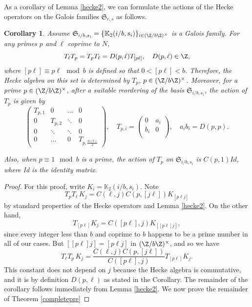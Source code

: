 \documentclass[12pt]{amsart}
\newtheorem{corollary}[theorem]{Corollary}
\theoremstyle{definition}
\theoremstyle{remark}
\begin{document}
As a corollary of Lemma \ref{hecke2}, 
we can formulate the actions of the Hecke operators on the Galois families $\mathfrak S_{r,s}$ as follows. 
\begin{corollary}\label{hecke4}
   Assume $\mathfrak S_{i/b,s_i}=\{\mathbb{K}_2(i/b,s_i)\}_{i\in (\Z/b\Z)^\times}$ is a Galois family. For any primes $p$ and $\ell$ coprime to $N$, 
    $$
     T_\ell T_p= T_pT_\ell =D(p,\ell)T_{[p\ell]},\quad   D(p,\ell) \in \Z,
    $$
    where $[p\ell] \equiv p\ell \mod b$ is defined so that $0<[p\ell]<b$. Therefore, the Hecke algebra on this set is determined by $T_p$, $p\in (\Z/b\Z)^\times$. Moreover,  for a prime $p\in (\Z/b\Z)^\times$, after a suitable reordering of the basis $\mathfrak S_{i/b,s_i}$, the action of $T_p$ is given by
    $$
       \begin{pmatrix}
             T_{p,1} &0& \dots & 0\\
             0& T_{p,2} & \ddots & 0\\
               0&\ddots & \ddots & 0\\
             0&\dots& 0&  T_{p,\frac{\phi(b)}2}
       \end{pmatrix},  \quad  
       T_{p,i}=
       \begin{pmatrix}
             0 &a_i\\
             b_i& 0\\
       \end{pmatrix}, \quad  a_ib_i = D(p,p). 
    $$   

Also, when $p\equiv 1\mod b$ is a prime, the action of $T_p$ on $\mathfrak S_{i/b,s_i}$ is $C(p,1)\mathit{Id}$, where Id is the identity matrix. 
\end{corollary}

\begin{proof}
 For this proof, write $K_i=\mathbb{K}_2(i/b,s_i)$. Note $$T_pT_\ell \, K_j=C(\ell,j)C(p,[j\ell])K_{[p \ell j]}$$ by standard properties of the Hecke operators and Lemma \ref{hecke2}. On the other hand, $$T_{[p\ell]}K_j=C([p\ell],j)K_{[[p\ell]j]},$$ since every integer less than $b$ and coprime to $b$ happens to be a prime number in all of our cases. But $[[p\ell]j]=[p\ell j]$ in $(\Z/b\Z)^\times$, and so we have $$T_{\ell}T_p\, K_j=\frac{C(\ell,j)C(p,[j\ell])}{C([p\ell],j)}T_{[p\ell]}K_j.$$ This constant does not depend on $j$ because the Hecke algebra is commutative, and it is by definition $D(p,\ell)$ as stated in the Corollary. The remainder of the corollary follows immediately from Lemma \ref{hecke2}.
We now prove the remainder of Theorem \ref{completepre}
\end{proof}
\end{document}
